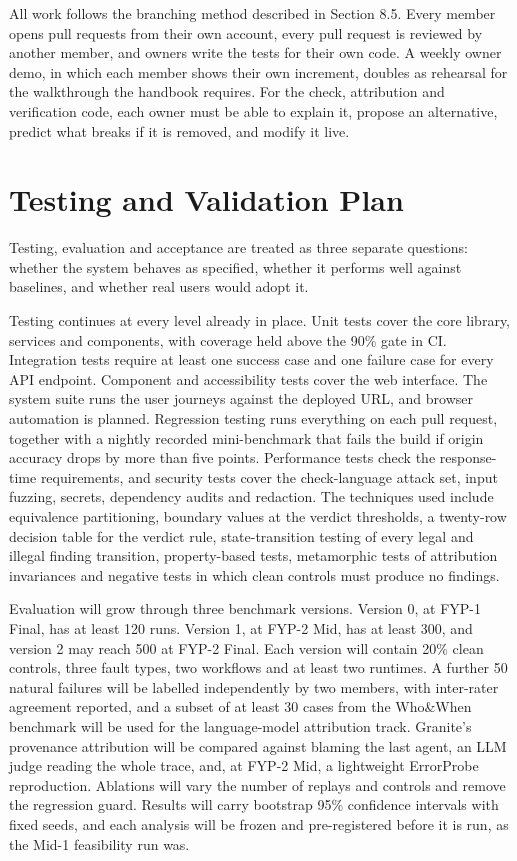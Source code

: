 All work follows the branching method described in Section 8.5. Every member opens pull requests from their own account, every pull request is reviewed by another member, and owners write the tests for their own code. A weekly owner demo, in which each member shows their own increment, doubles as rehearsal for the walkthrough the handbook requires. For the check, attribution and verification code, each owner must be able to explain it, propose an alternative, predict what breaks if it is removed, and modify it live.

\section{Testing and Validation Plan}

Testing, evaluation and acceptance are treated as three separate questions: whether the system behaves as specified, whether it performs well against baselines, and whether real users would adopt it.

Testing continues at every level already in place. Unit tests cover the core library, services and components, with coverage held above the 90\% gate in CI. Integration tests require at least one success case and one failure case for every API endpoint. Component and accessibility tests cover the web interface. The system suite runs the user journeys against the deployed URL, and browser automation is planned. Regression testing runs everything on each pull request, together with a nightly recorded mini-benchmark that fails the build if origin accuracy drops by more than five points. Performance tests check the response-time requirements, and security tests cover the check-language attack set, input fuzzing, secrets, dependency audits and redaction. The techniques used include equivalence partitioning, boundary values at the verdict thresholds, a twenty-row decision table for the verdict rule, state-transition testing of every legal and illegal finding transition, property-based tests, metamorphic tests of attribution invariances and negative tests in which clean controls must produce no findings.

Evaluation will grow through three benchmark versions. Version 0, at FYP-1 Final, has at least 120 runs. Version 1, at FYP-2 Mid, has at least 300, and version 2 may reach 500 at FYP-2 Final. Each version will contain 20\% clean controls, three fault types, two workflows and at least two runtimes. A further 50 natural failures will be labelled independently by two members, with inter-rater agreement reported, and a subset of at least 30 cases from the Who\&When benchmark will be used for the language-model attribution track. Granite's provenance attribution will be compared against blaming the last agent, an LLM judge reading the whole trace, and, at FYP-2 Mid, a lightweight ErrorProbe reproduction. Ablations will vary the number of replays and controls and remove the regression guard. Results will carry bootstrap 95\% confidence intervals with fixed seeds, and each analysis will be frozen and pre-registered before it is run, as the Mid-1 feasibility run was.

